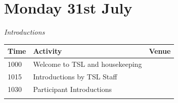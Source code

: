 \documentclass[12pt,]{book}
\theoremstyle{definition}
\theoremstyle{definition}
\theoremstyle{remark}
\begin{document}
\section*{Monday 31st July}\label{monday-31st-july}

\emph{Introductions}

\begin{longtable}[]{@{}lll@{}}
\toprule
\begin{minipage}[b]{0.09\columnwidth}\raggedright\strut
Time\strut
\end{minipage} & \begin{minipage}[b]{0.38\columnwidth}\raggedright\strut
Activity\strut
\end{minipage} & \begin{minipage}[b]{0.38\columnwidth}\raggedright\strut
Venue\strut
\end{minipage}\tabularnewline
\midrule
\endhead
\begin{minipage}[t]{0.09\columnwidth}\raggedright\strut
1000\strut
\end{minipage} & \begin{minipage}[t]{0.38\columnwidth}\raggedright\strut
Welcome to TSL and housekeeping\strut
\end{minipage} & \begin{minipage}[t]{0.38\columnwidth}\raggedright\strut
\strut
\end{minipage}\tabularnewline
\begin{minipage}[t]{0.09\columnwidth}\raggedright\strut
1015\strut
\end{minipage} & \begin{minipage}[t]{0.38\columnwidth}\raggedright\strut
Introductions by TSL Staff\strut
\end{minipage} & \begin{minipage}[t]{0.38\columnwidth}\raggedright\strut
\strut
\end{minipage}\tabularnewline
\begin{minipage}[t]{0.09\columnwidth}\raggedright\strut
1030\strut
\end{minipage} & \begin{minipage}[t]{0.38\columnwidth}\raggedright\strut
Participant Introductions\strut
\end{minipage} & \begin{minipage}[t]{0.38\columnwidth}\raggedright\strut
\strut
\end{minipage}\tabularnewline
\begin{minipage}[t]{0.09\columnwidth}\raggedright\strut

\end{minipage}
\end{longtable}
\end{document}
